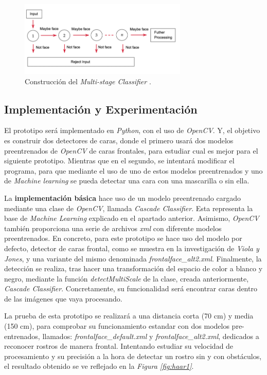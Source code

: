 \begin{figure}[htp]
	\centering
	\includegraphics[width=8cm]{imagenes/ada2.png}
	\caption{Construcción del \textit{Multi-stage Classifier} \cite{adaboost2}.}
	\label{fig:ada2}
\end{figure}


\subsection*{Implementación y Experimentación}

El prototipo será implementado en \textit{Python}, con el uso de \textit{OpenCV}. Y, el objetivo es construir dos detectores de caras, donde el primero usará dos modelos preentrenados de \textit{OpenCV} de caras frontales, para estudiar cual es mejor para el siguiente prototipo. Mientras que en el segundo, se intentará modificar el programa, para que mediante el uso de uno de estos modelos preentrenados y uno de \textit{Machine learning} se pueda detectar una cara con una mascarilla o sin ella.

La \textbf{implementación básica} hace uso de un modelo preentrenado cargado mediante una clase de \textit{OpenCV}, llamada \textit{Cascade Classifier}. Esta representa la base de \textit{Machine Learning} explicado en el apartado anterior. Asimismo, \textit{OpenCV} también proporciona una serie de archivos \textit{xml} con diferente modelos preentrenados. En concreto, para este prototipo se hace uso del modelo por defecto, detector de caras frontal, como se muestra en la investigación de \textit{Viola y Jones}, y una variante del mismo denominada \textit{frontalface\_alt2.xml}. Finalmente, la detección se realiza, tras hacer una transformación del espacio de color a blanco y negro, mediante la función \textit{detectMultiScale} de la clase, creada anteriormente, \textit{Cascade Classifier}. Concretamente, su funcionalidad será encontrar caras dentro de las imágenes que vaya procesando.

La prueba de esta prototipo se realizará a una distancia corta (70 cm)  y media (150 cm), para comprobar su funcionamiento estandar con dos modelos pre-entrenados, llamados:  \textit{frontalface\_default.xml} y \textit{frontalface\_alt2.xml}, dedicados a reconocer rostros de manera frontal. Intentando estudiar su velocidad de procesamiento y su precisión a la hora de detectar un rostro sin y con obstáculos, el resultado obtenido se ve reflejado en la \textit{Figura \ref{fig:haar1}}.

